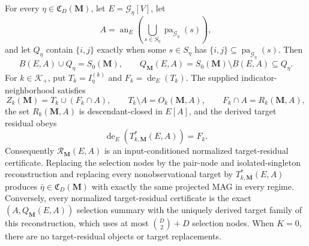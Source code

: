 For every \(\eta\in\mathfrak C_D(\mathbf M)\), let \(E=\mathcal G_\eta[V]\), let
\[
A=\operatorname{an}_E\!\left(\bigcup_{s\in S_\eta}\operatorname{pa}_{\mathcal G_\eta}(s)\right),
\]
and let \(Q_\eta\) contain \(\{i,j\}\) exactly when some \(s\in S_\eta\) has \(\{i,j\}\subseteq\operatorname{pa}_{\mathcal G_\eta}(s)\).  Then
\[
B(E,A)\cup Q_\eta=S_0(\mathbf M),
\qquad
Q_{\mathbf M}(E,A)=S_0(\mathbf M)\setminus B(E,A)\subseteq Q_\eta.
\]
For \(k\in\mathcal K_+\), put \(T_k=I_\eta^{(k)}\) and \(F_k=\operatorname{de}_E(T_k)\).  The supplied indicator-neighborhood satisfies
\[
Z_k(\mathbf M)=T_k\cup(F_k\cap A),
\qquad
T_k\setminus A=O_k(\mathbf M,A),
\qquad
F_k\cap A=R_k(\mathbf M,A),
\]
the set \(R_k(\mathbf M,A)\) is descendant-closed in \(E[A]\), and the derived target residual obeys
\[
\operatorname{de}_E\!\left(T^*_{k,\mathbf M}(E,A)\right)=F_k.
\]
Consequently \(\mathcal R_{\mathbf M}(E,A)\) is an input-conditioned normalized target-residual certificate.  Replacing the selection nodes by the pair-node and isolated-singleton reconstruction and replacing every nonobservational target by \(T^*_{k,\mathbf M}(E,A)\) produces \(\bar\eta\in\mathfrak C_D(\mathbf M)\) with exactly the same projected MAG in every regime.  Conversely, every normalized target-residual certificate is the exact \((A,Q_{\mathbf M}(E,A))\) selection summary with the uniquely derived target family of this reconstruction, which uses at most \(\binom D2+D\) selection nodes.  When \(K=0\), there are no target-residual objects or target replacements.